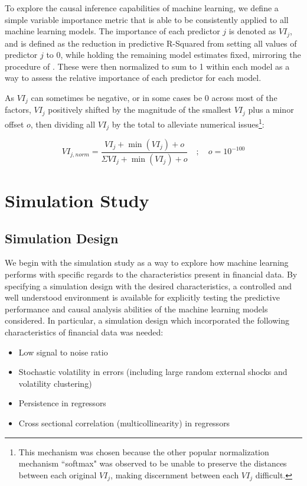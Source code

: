 \documentclass[11pt, a4paper, table]{article}
\begin{document}
To explore the causal inference capabilities of machine learning, we define a simple variable importance metric that is able to be consistently applied to all machine learning models. The importance of each predictor $j$ is denoted as $VI_j$, and is defined as the reduction in predictive R-Squared from setting all values of predictor $j$ to 0, while holding the remaining model estimates fixed, mirroring the procedure of \cite{gu_empirical_2018}. These were then normalized to sum to 1 within each model as a way to assess the relative importance of each predictor for each model. 

As $VI_j$ can sometimes be negative, or in some cases be 0 across most of the factors, $VI_j$ positively shifted by the magnitude of the smallest $VI_j$ plus a minor offset $o$, then dividing all $VI_j$ by the total to alleviate numerical issues\footnote{This mechanism was chosen because the other popular normalization mechanism ``softmax" was observed to be unable to preserve the distances between each original $VI_j$, making discernment between each $VI_j$ difficult.}:

\begin{equation}
VI_{j, norm} = \frac{VI_j + \operatorname{min}(VI_j) + o}
{\Sigma VI_j + \operatorname{min}(VI_j) + o} \quad ; \quad o = 10^{-100}
\end{equation}

\newpage

\section{Simulation Study}

\subsection{Simulation Design}

We begin with the simulation study as a way to explore how machine learning performs with specific regards to the characteristics present in financial data. By specifying a simulation design with the desired characteristics, a controlled and well understood environment is available for explicitly testing the predictive performance and causal analysis abilities of the machine learning models considered. In particular, a simulation design which incorporated the following characteristics of financial data was needed:

\begin{itemize}
\item Low signal to noise ratio
\item Stochastic volatility in errors (including large random external shocks and volatility clustering)
\item Persistence in regressors
\item Cross sectional correlation (multicollinearity) in regressors
\end{itemize}
\end{document}
